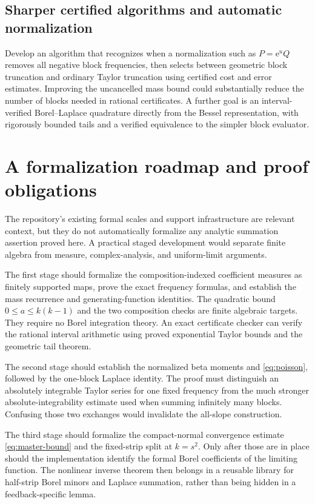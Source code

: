 \documentclass[11pt,a4paper]{article}
\numberwithin{equation}{section}
\theoremstyle{definition}
\theoremstyle{remark}
\newcommand{\ee}{\mathrm e}
\begin{document}
\subsection{Sharper certified algorithms and automatic normalization}
Develop an algorithm that recognizes when a normalization such as
$P=\ee^uQ$ removes all negative block frequencies, then selects between
geometric block truncation and ordinary Taylor truncation using certified
cost and error estimates.  Improving the uncancelled mass bound could
substantially reduce the number of blocks needed in rational certificates.
A further goal is an interval-verified Borel--Laplace quadrature directly
from the Bessel representation, with rigorously bounded tails and a
verified equivalence to the simpler block evaluator.

\section{A formalization roadmap and proof obligations}
\label{sec:lean}

The repository's existing formal scales and support infrastructure are
relevant context, but they do not automatically formalize any analytic
summation assertion proved here.  A practical staged development would
separate finite algebra from measure, complex-analysis, and uniform-limit
arguments.

The first stage should formalize the composition-indexed coefficient
measures as finitely supported maps, prove the exact frequency formulas,
and establish the mass recurrence and generating-function identities.
The quadratic bound $0\le a\le k(k-1)$ and the two composition checks are
finite algebraic targets.  They require no Borel integration theory.
An exact certificate checker can verify the rational interval arithmetic
using proved exponential Taylor bounds and the geometric tail theorem.

The second stage should establish the normalized beta moments and
\eqref{eq:poisson}, followed by the one-block Laplace identity.  The proof
must distinguish an absolutely integrable Taylor series for one fixed
frequency from the much stronger absolute-integrability estimate used
when summing infinitely many blocks.  Confusing those two exchanges would
invalidate the all-slope construction.

The third stage should formalize the compact-normal convergence estimate
\eqref{eq:master-bound} and the fixed-strip split at $k=s^2$.  Only after
those are in place should the implementation identify the formal Borel
coefficients of the limiting function.  The nonlinear inverse theorem
then belongs in a reusable library for half-strip Borel minors and
Laplace summation, rather than being hidden in a feedback-specific lemma.
\end{document}
